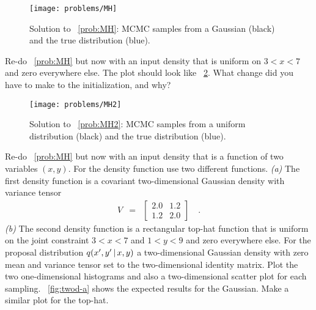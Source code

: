 \documentclass[12pt,twoside,pdftex]{article}
\begin{document}
\begin{figure}[!htbp]
\begin{center}
\texttt{[image: problems/MH]}
\end{center}
\caption{Solution to \problemname~\ref{prob:MH}:
MCMC samples from a Gaussian (black) and the true distribution (blue).}
\label{fig:MH}
\end{figure}

\begin{problem}\label{prob:MH2}
Re-do \problemname~\ref{prob:MH} but now with an input density
that is uniform on $3<x<7$ and zero everywhere else.
The plot should look like \figurename~\ref{fig:MH2}.
What change did you have to make to the initialization, and why?
\end{problem}

\begin{figure}[!htbp]
\begin{center}
\texttt{[image: problems/MH2]}
\end{center}
\caption{Solution to \problemname~\ref{prob:MH2}:
MCMC samples from a uniform distribution (black) and the true distribution
(blue).}
\label{fig:MH2}
\end{figure}

\begin{problem}\label{prob:twod}
Re-do \problemname~\ref{prob:MH} but now with an input density
that is a function of two variables $(x, y)$.
For the density function use two different functions.
\emph{(a)} The first density function is a covariant two-dimensional Gaussian
density with variance tensor
\begin{eqnarray}
V &=& \left[\begin{array}{cc} 2.0 & 1.2 \\ 1.2 & 2.0 \end{array}\right]
\quad.
\end{eqnarray}
\emph{(b)} The second density function is a rectangular top-hat function that
is uniform on the joint constraint $3<x<7$ and $1<y<9$ and zero everywhere else.
For the proposal distribution $q(x', y'\,|\, x, y)$ a two-dimensional Gaussian
density with zero mean and variance tensor set to the two-dimensional
identity matrix.
Plot the two one-dimensional histograms and also a two-dimensional scatter
plot for each sampling.
\figurename~\ref{fig:twod-a} shows the expected results for the Gaussian.
Make a similar plot for the top-hat.
\end{problem}
\end{document}
